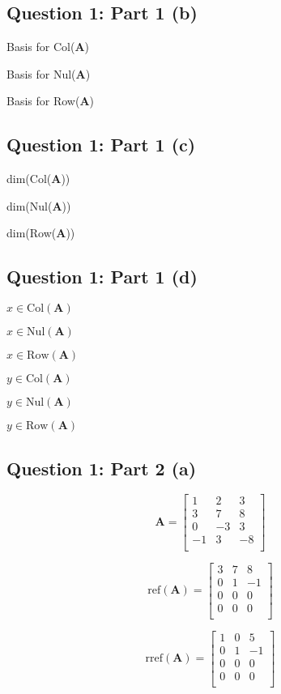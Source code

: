 \documentclass{article}
\begin{document}
\subsection{Question 1: Part 1 (b)} 
Basis for Col($ \mathbf{A} $)

Basis for Nul($ \mathbf{A} $)

Basis for Row($ \mathbf{A} $)

\subsection{Question 1: Part 1 (c)} 
dim(Col($ \mathbf{A} $))

dim(Nul($ \mathbf{A} $))

dim(Row($ \mathbf{A} $))
\subsection{Question 1: Part 1 (d)} 

$ x \in \text{Col}(\mathbf{A}) $

$ x \in \text{Nul}(\mathbf{A}) $

$ x \in \text{Row}(\mathbf{A}) $

\vspace{2mm}

$ y \in \text{Col}(\mathbf{A}) $

$ y \in \text{Nul}(\mathbf{A}) $

$ y \in \text{Row}(\mathbf{A}) $
\subsection{Question 1: Part 2 (a)} 


\[%
    \mathbf{A}
    =
    \begin{bmatrix} 
        1 & 2 & 3 \\
		3 & 7 & 8 \\
		0 & -3 & 3 \\
		-1 & 3 & -8 \\		
    \end{bmatrix}
\]%

\[%
    \text{ref} (\mathbf{A}) 
    =
    \begin{bmatrix} 
        3 & 7 & 8 \\
		0 & 1 & -1 \\
		0 & 0 & 0 \\
		0 & 0 & 0 \\		
    \end{bmatrix}
\]%

\[%
    \text{rref} (\mathbf{A}) 
    =
    \begin{bmatrix} 
        1 & 0 & 5 \\
		0 & 1 & -1 \\
		0 & 0 & 0 \\
		0 & 0 & 0 \\		
    \end{bmatrix}
\]%
\end{document}
